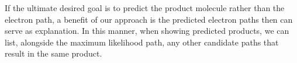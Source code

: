 If the ultimate desired goal is to predict the product molecule rather than the electron path,
a benefit of our approach is the predicted electron paths then can serve as explanation. 
In this manner, when showing predicted products, we can list, alongside the maximum likelihood path, any other candidate paths that result in the same product. 

%






